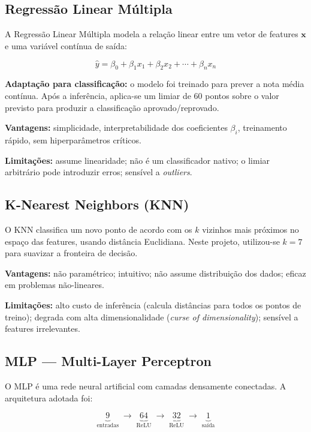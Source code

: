\documentclass[12pt, a4paper]{article}
\begin{document}
\subsection{Regressão Linear Múltipla}

A Regressão Linear Múltipla modela a relação linear entre um vetor de
features $\mathbf{x}$ e uma variável contínua de saída:

\[
  \hat{y} = \beta_0 + \beta_1 x_1 + \beta_2 x_2 + \cdots + \beta_n x_n
\]

\noindent\textbf{Adaptação para classificação:} o modelo foi treinado para
prever a nota média contínua. Após a inferência, aplica-se um limiar de
60 pontos sobre o valor previsto para produzir a classificação
aprovado/reprovado.

\noindent\textbf{Vantagens:} simplicidade, interpretabilidade dos coeficientes
$\beta_i$, treinamento rápido, sem hiperparâmetros críticos.

\noindent\textbf{Limitações:} assume linearidade; não é um classificador
nativo; o limiar arbitrário pode introduzir erros; sensível a \textit{outliers}.

\subsection{K-Nearest Neighbors (KNN)}

O KNN classifica um novo ponto de acordo com os $k$ vizinhos mais próximos
no espaço das features, usando distância Euclidiana. Neste projeto, utilizou-se
$k=7$ para suavizar a fronteira de decisão.

\noindent\textbf{Vantagens:} não paramétrico; intuitivo; não assume
distribuição dos dados; eficaz em problemas não-lineares.

\noindent\textbf{Limitações:} alto custo de inferência (calcula distâncias
para todos os pontos de treino); degrada com alta dimensionalidade
(\textit{curse of dimensionality}); sensível a features irrelevantes.

\subsection{MLP --- Multi-Layer Perceptron}

O MLP é uma rede neural artificial com camadas densamente conectadas.
A arquitetura adotada foi:

\[
  \underbrace{9}_{\text{entradas}} \;\longrightarrow\;
  \underbrace{64}_{\text{ReLU}} \;\longrightarrow\;
  \underbrace{32}_{\text{ReLU}} \;\longrightarrow\;
  \underbrace{1}_{\text{saída}}
\]
\end{document}
